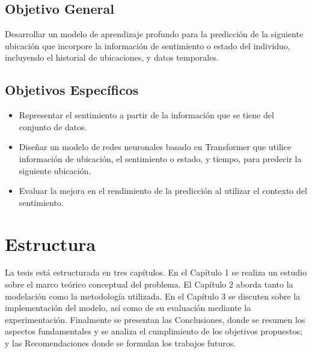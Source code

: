 \subsection{Objetivo General}

Desarrollar un modelo de aprendizaje profundo para la predicción de la siguiente ubicación que 
incorpore la información de sentimiento o estado del individuo, 
incluyendo el historial de ubicaciones, y datos 
temporales.

\subsection{Objetivos Específicos}

\begin{itemize}
    \item Representar el sentimiento a partir de la información 
    que se tiene del conjunto de datos.
    \item Diseñar un modelo de redes neuronales basado en Transformer que utilice 
    información de ubicación, el sentimiento o estado, y tiempo, para predecir 
    la siguiente ubicación.
    \item Evaluar la mejora en el rendimiento de la predicción al 
    utilizar el contexto del sentimiento.
\end{itemize}

\section{Estructura}
La tesis est\'a estructurada en tres capítulos. En el 
Capítulo 1 se
realiza un estudio sobre el marco teórico conceptual del problema. 
El Capítulo 2 aborda tanto la modelación como la metodolog\'ia utilizada. 
En el Capítulo 3
se discuten sobre la implementación del modelo, as\'i como de su 
evaluaci\'on mediante la experimentaci\'on. Finalmente se presentan las Conclusiones, donde se resumen los aspectos 
fundamentales y se analiza el cumplimiento de los objetivos propuestos; y las Recomendaciones donde se formulan los trabajos futuros.\\
